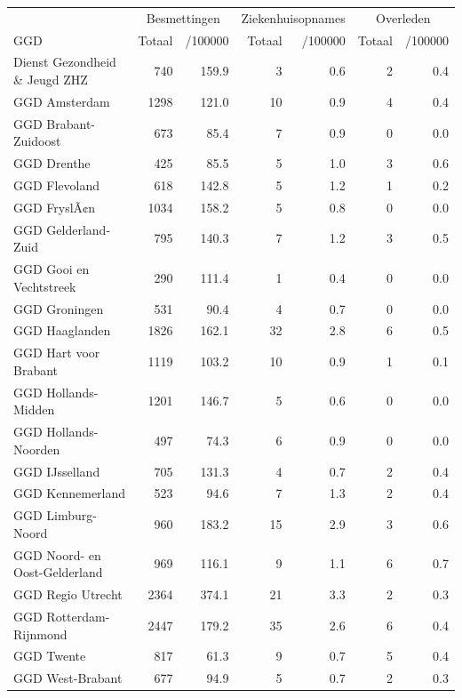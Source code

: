 \documentclass[
  english,
  man,floatsintext]{apa6}
\begin{document}
\begin{table}
\centering\begingroup\fontsize{10}{12}\selectfont

\begin{threeparttable}
\begin{tabular}{lrrrrrr}
\toprule
\multicolumn{1}{c}{ } & \multicolumn{2}{c}{Besmettingen} & \multicolumn{2}{c}{Ziekenhuisopnames} & \multicolumn{2}{c}{Overleden} \\
\cmidrule(l{3pt}r{3pt}){2-3} \cmidrule(l{3pt}r{3pt}){4-5} \cmidrule(l{3pt}r{3pt}){6-7}
GGD & Totaal & /100000 & Totaal & /100000 & Totaal & /100000\\
\midrule
Dienst Gezondheid \& Jeugd ZHZ & 740 & 159.9 & 3 & 0.6 & 2 & 0.4\\
GGD Amsterdam & 1298 & 121.0 & 10 & 0.9 & 4 & 0.4\\
GGD Brabant-Zuidoost & 673 & 85.4 & 7 & 0.9 & 0 & 0.0\\
GGD Drenthe & 425 & 85.5 & 5 & 1.0 & 3 & 0.6\\
GGD Flevoland & 618 & 142.8 & 5 & 1.2 & 1 & 0.2\\
GGD FryslÃ¢n & 1034 & 158.2 & 5 & 0.8 & 0 & 0.0\\
GGD Gelderland-Zuid & 795 & 140.3 & 7 & 1.2 & 3 & 0.5\\
GGD Gooi en Vechtstreek & 290 & 111.4 & 1 & 0.4 & 0 & 0.0\\
GGD Groningen & 531 & 90.4 & 4 & 0.7 & 0 & 0.0\\
GGD Haaglanden & 1826 & 162.1 & 32 & 2.8 & 6 & 0.5\\
GGD Hart voor Brabant & 1119 & 103.2 & 10 & 0.9 & 1 & 0.1\\
GGD Hollands-Midden & 1201 & 146.7 & 5 & 0.6 & 0 & 0.0\\
GGD Hollands-Noorden & 497 & 74.3 & 6 & 0.9 & 0 & 0.0\\
GGD IJsselland & 705 & 131.3 & 4 & 0.7 & 2 & 0.4\\
GGD Kennemerland & 523 & 94.6 & 7 & 1.3 & 2 & 0.4\\
GGD Limburg-Noord & 960 & 183.2 & 15 & 2.9 & 3 & 0.6\\
GGD Noord- en Oost-Gelderland & 969 & 116.1 & 9 & 1.1 & 6 & 0.7\\
GGD Regio Utrecht & 2364 & 374.1 & 21 & 3.3 & 2 & 0.3\\
GGD Rotterdam-Rijnmond & 2447 & 179.2 & 35 & 2.6 & 6 & 0.4\\
GGD Twente & 817 & 61.3 & 9 & 0.7 & 5 & 0.4\\
GGD West-Brabant & 677 & 94.9 & 5 & 0.7 & 2 & 0.3\\

\end{tabular}
\end{threeparttable}
\end{table}
\end{document}

